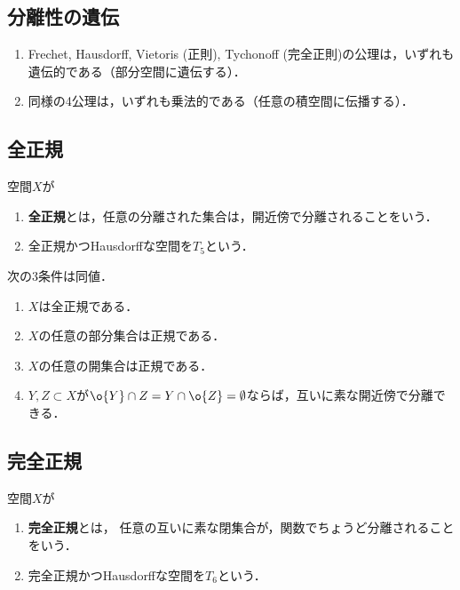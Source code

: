\documentclass[uplatex,dvipdfmx]{jsreport}
\begin{document}
\subsection{分離性の遺伝}

\begin{proposition}\mbox{}
    \begin{enumerate}
        \item Frechet, Hausdorff, Vietoris (正則), Tychonoff (完全正則)の公理は，いずれも遺伝的である（部分空間に遺伝する）．
        \item 同様の4公理は，いずれも乗法的である（任意の積空間に伝播する）．
    \end{enumerate}
\end{proposition}

\subsection{全正規}

\begin{definition}
    空間$X$が
    \begin{enumerate}
        \item \textbf{全正規}とは，任意の分離された集合は，開近傍で分離されることをいう．
        \item 全正規かつHausdorffな空間を$T_5$という．
    \end{enumerate}
\end{definition}

\begin{proposition}
    次の3条件は同値．
    \begin{enumerate}
        \item $X$は全正規である．
        \item $X$の任意の部分集合は正規である．
        \item $X$の任意の開集合は正規である．
        \item $Y,Z\subset X$が$\o{Y}\cap Z=Y\cap\o{Z}=\emptyset$ならば，互いに素な開近傍で分離できる．
    \end{enumerate}
\end{proposition}

\subsection{完全正規}

\begin{definition}
    空間$X$が
    \begin{enumerate}
        \item \textbf{完全正規}とは，
        任意の互いに素な閉集合が，関数でちょうど分離されることをいう．
        \item 完全正規かつHausdorffな空間を$T_6$という．
    \end{enumerate}
\end{definition}
\end{document}
